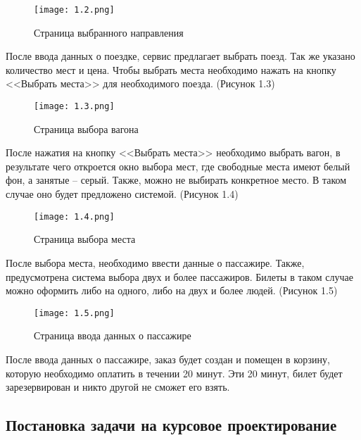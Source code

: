 \begin{figure}[h]
    \centering
    \texttt{[image: 1.2.png]}
    \caption{Страница выбранного направления}
  \end{figure}

После ввода данных о поездке, сервис предлагает выбрать поезд. Так же указано количество мест и цена. Чтобы выбрать места необходимо нажать на кнопку <<Выбрать места>> для необходимого поезда. (Рисунок 1.3)  \\

\begin{figure}[h]
  \centering
  \texttt{[image: 1.3.png]}
  \caption{Страница выбора вагона}
\end{figure}

После нажатия на кнопку <<Выбрать места>> необходимо выбрать вагон, в результате чего откроется окно выбора мест, где свободные места имеют белый фон, а занятые -- серый. Также, можно не выбирать конкретное место. В таком случае оно будет предложено системой. (Рисунок 1.4) \\

\begin{figure}[h]
  \centering
  \texttt{[image: 1.4.png]}
  \caption{Страница выбора места}
\end{figure}

После выбора места, необходимо ввести данные о пассажире. Также, предусмотрена система выбора двух и более пассажиров. Билеты в таком случае можно оформить либо на одного, либо на двух и более людей. (Рисунок 1.5)\\

\begin{figure}[h]
  \centering
  \texttt{[image: 1.5.png]}
  \caption{Страница ввода данных о пассажире}
\end{figure}

После ввода данных о пассажире, заказ будет создан и помещен в корзину, которую необходимо оплатить в течении 20 минут. Эти 20 минут, билет будет зарезервирован и никто другой не сможет его взять.
\subsection{Постановка задачи на курсовое проектирование}

